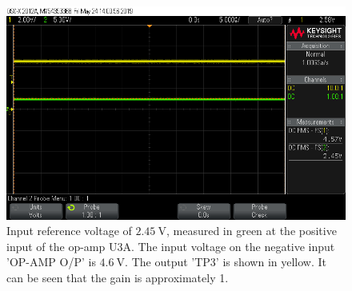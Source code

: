 \begin{figure}[H]
\centering
\includegraphics[width=.9\textwidth]{figures/scope_15.png}
\caption{Input reference voltage of $\SI{2.45}{\volt}$, measured in green at the positive input of the op-amp U3A. The input voltage on the negative input 'OP-AMP O/P' is $\SI{4.6}{\volt}$. The output 'TP3' is shown in yellow. It can be seen that the gain is approximately 1.}
\label{fig:scope_15}
\end{figure}

